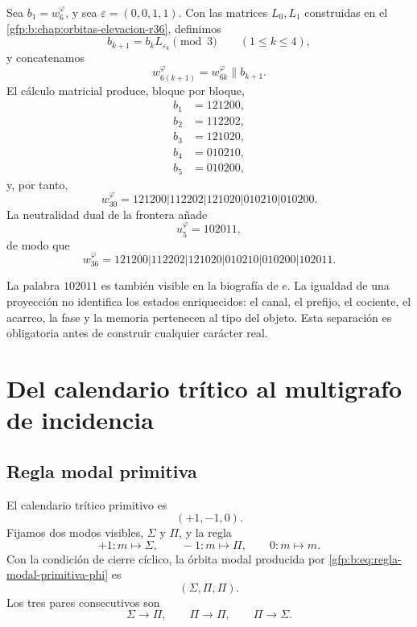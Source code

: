 Sea \(b_1=w_6^{\varphi}\), y sea
\(\varepsilon=(0,0,1,1)\). Con las matrices \(L_0,L_1\) construidas en el
\cref{gfp:b:chap:orbitas-elevacion-r36}, definimos
\[
 b_{k+1}=b_kL_{\varepsilon_k}\pmod3
 \qquad(1\leq k\leq4),
\]
y concatenamos
\[
 w_{6(k+1)}^{\varphi}=w_{6k}^{\varphi}\mathbin{\|}b_{k+1}.
\]
El cálculo matricial produce, bloque por bloque,
\[
\begin{aligned}
 b_1&=121200,\\
 b_2&=112202,\\
 b_3&=121020,\\
 b_4&=010210,\\
 b_5&=010200,
\end{aligned}
\]
y, por tanto,
\begin{equation}
 \boxed{
 w_{30}^{\varphi}
 =121200|112202|121020|010210|010200.}
 \label{gfp:b:eq:w30-phi}
\end{equation}
La neutralidad dual de la frontera añade
\[
 u_5^{\varphi}=102011,
\]
de modo que
\begin{equation}
 \boxed{
 w_{36}^{\varphi}
 =121200|112202|121020|010210|010200|102011.}
 \label{gfp:b:eq:w36-phi}
\end{equation}

\begin{remark}
La palabra \(102011\) es también visible en la biografía de \(e\). La
igualdad de una proyección no identifica los estados enriquecidos: el canal,
el prefijo, el cociente, el acarreo, la fase y la memoria pertenecen al tipo
del objeto. Esta separación es obligatoria antes de construir cualquier
carácter real.
\end{remark}

\section{Del calendario trítico al multigrafo de incidencia}

\subsection{Regla modal primitiva}

El calendario trítico primitivo es
\[
 (+1,-1,0).
\]
Fijamos dos modos visibles, \(\Sigma\) y \(\Pi\), y la regla
\begin{equation}
 +1:m\longmapsto\Sigma,
 \qquad
 -1:m\longmapsto\Pi,
 \qquad
 0:m\longmapsto m.
 \label{gfp:b:eq:regla-modal-primitiva-phi}
\end{equation}
Con la condición de cierre cíclico, la órbita modal producida por
\eqref{gfp:b:eq:regla-modal-primitiva-phi} es
\[
 \boxed{(\Sigma,\Pi,\Pi).}
\]
Los tres pares consecutivos son
\[
 \Sigma\longrightarrow\Pi,
 \qquad
 \Pi\longrightarrow\Pi,
 \qquad
 \Pi\longrightarrow\Sigma.
\]

